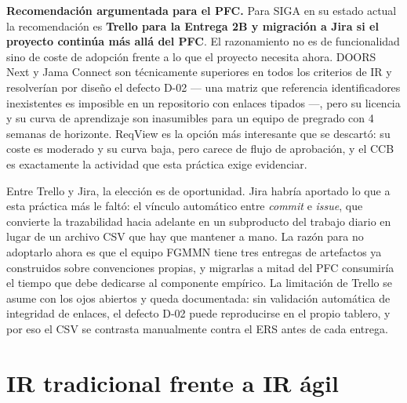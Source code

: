 \documentclass[11pt,letterpaper]{article}
\begin{document}
\textbf{Recomendación argumentada para el PFC.} Para SIGA en su estado actual la recomendación es \textbf{Trello para la Entrega 2B y migración a Jira si el proyecto continúa más allá del PFC}. El razonamiento no es de funcionalidad sino de coste de adopción frente a lo que el proyecto necesita ahora. DOORS Next y Jama Connect son técnicamente superiores en todos los criterios de IR y resolverían por diseño el defecto D-02 --- una matriz que referencia identificadores inexistentes es imposible en un repositorio con enlaces tipados ---, pero su licencia y su curva de aprendizaje son inasumibles para un equipo de pregrado con 4 semanas de horizonte. ReqView es la opción más interesante que se descartó: su coste es moderado y su curva baja, pero carece de flujo de aprobación, y el CCB es exactamente la actividad que esta práctica exige evidenciar.

Entre Trello y Jira, la elección es de oportunidad. Jira habría aportado lo que a esta práctica más le faltó: el vínculo automático entre \emph{commit} e \emph{issue}, que convierte la trazabilidad hacia adelante en un subproducto del trabajo diario en lugar de un archivo CSV que hay que mantener a mano. La razón para no adoptarlo ahora es que el equipo FGMMN tiene tres entregas de artefactos ya construidos sobre convenciones propias, y migrarlas a mitad del PFC consumiría el tiempo que debe dedicarse al componente empírico. La limitación de Trello se asume con los ojos abiertos y queda documentada: sin validación automática de integridad de enlaces, el defecto D-02 puede reproducirse en el propio tablero, y por eso el CSV se contrasta manualmente contra el ERS antes de cada entrega.

\section{IR tradicional frente a IR ágil}
\end{document}
